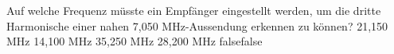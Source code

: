     {Auf welche Frequenz müsste ein Empfänger eingestellt werden, um die dritte Harmonische einer nahen 7,050 MHz-Aussendung erkennen zu können?}
    {21,150 MHz}
    {14,100 MHz}
    {35,250 MHz}
    {28,200 MHz}
    {false}{false}